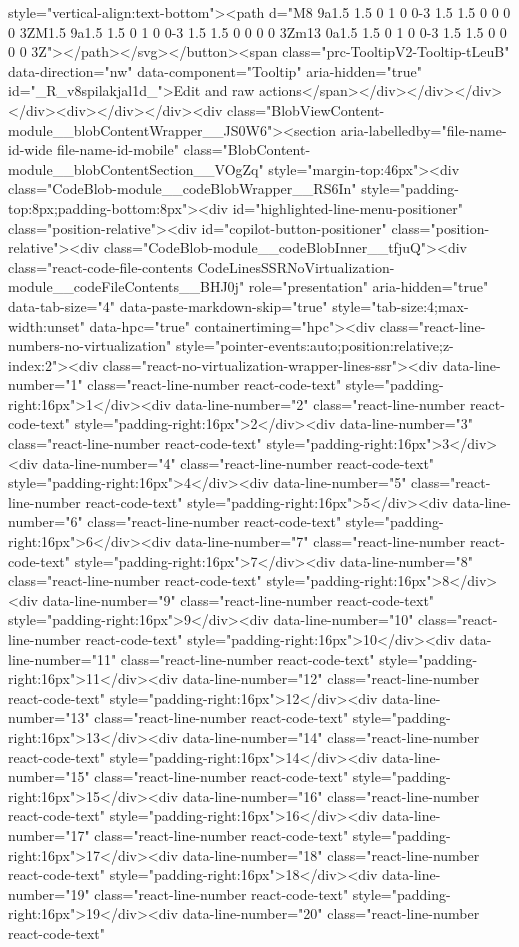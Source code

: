{{{{{style="vertical-align:text-bottom"><path d="M8 9a1.5 1.5 0 1 0 0-3 1.5 1.5 0 0 0 0 3ZM1.5 9a1.5 1.5 0 1 0 0-3 1.5 1.5 0 0 0 0 3Zm13 0a1.5 1.5 0 1 0 0-3 1.5 1.5 0 0 0 0 3Z"></path></svg></button><span class="prc-TooltipV2-Tooltip-tLeuB" data-direction="nw" data-component="Tooltip" aria-hidden="true" id="_R_v8spilakjal1d_">Edit and raw actions</span></div></div></div></div><div></div></div><div class="BlobViewContent-module__blobContentWrapper__JS0W6"><section aria-labelledby="file-name-id-wide file-name-id-mobile" class="BlobContent-module__blobContentSection__VOgZq" style="margin-top:46px"><div class="CodeBlob-module__codeBlobWrapper__RS6In" style="padding-top:8px;padding-bottom:8px"><div id="highlighted-line-menu-positioner" class="position-relative"><div id="copilot-button-positioner" class="position-relative"><div class="CodeBlob-module__codeBlobInner__tfjuQ"><div class="react-code-file-contents CodeLinesSSRNoVirtualization-module__codeFileContents__BHJ0j" role="presentation" aria-hidden="true" data-tab-size="4" data-paste-markdown-skip="true" style="tab-size:4;max-width:unset" data-hpc="true" containertiming="hpc"><div class="react-line-numbers-no-virtualization" style="pointer-events:auto;position:relative;z-index:2"><div class="react-no-virtualization-wrapper-lines-ssr"><div data-line-number="1" class="react-line-number react-code-text" style="padding-right:16px">1</div><div data-line-number="2" class="react-line-number react-code-text" style="padding-right:16px">2</div><div data-line-number="3" class="react-line-number react-code-text" style="padding-right:16px">3</div><div data-line-number="4" class="react-line-number react-code-text" style="padding-right:16px">4</div><div data-line-number="5" class="react-line-number react-code-text" style="padding-right:16px">5</div><div data-line-number="6" class="react-line-number react-code-text" style="padding-right:16px">6</div><div data-line-number="7" class="react-line-number react-code-text" style="padding-right:16px">7</div><div data-line-number="8" class="react-line-number react-code-text" style="padding-right:16px">8</div><div data-line-number="9" class="react-line-number react-code-text" style="padding-right:16px">9</div><div data-line-number="10" class="react-line-number react-code-text" style="padding-right:16px">10</div><div data-line-number="11" class="react-line-number react-code-text" style="padding-right:16px">11</div><div data-line-number="12" class="react-line-number react-code-text" style="padding-right:16px">12</div><div data-line-number="13" class="react-line-number react-code-text" style="padding-right:16px">13</div><div data-line-number="14" class="react-line-number react-code-text" style="padding-right:16px">14</div><div data-line-number="15" class="react-line-number react-code-text" style="padding-right:16px">15</div><div data-line-number="16" class="react-line-number react-code-text" style="padding-right:16px">16</div><div data-line-number="17" class="react-line-number react-code-text" style="padding-right:16px">17</div><div data-line-number="18" class="react-line-number react-code-text" style="padding-right:16px">18</div><div data-line-number="19" class="react-line-number react-code-text" style="padding-right:16px">19</div><div data-line-number="20" class="react-line-number react-code-text" }}}}}

